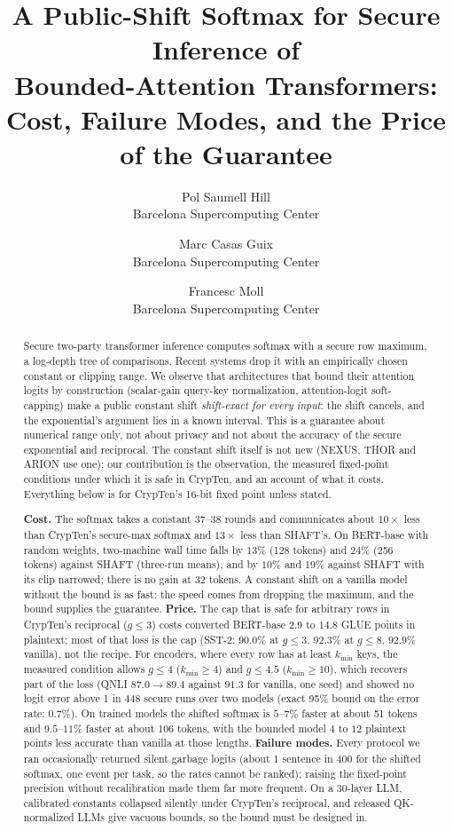 \documentclass[11pt]{article}
\title{A Public-Shift Softmax for Secure Inference of\\
Bounded-Attention Transformers: Cost, Failure Modes, and the Price of the Guarantee}
\author{Pol Saumell Hill\\\small Barcelona Supercomputing Center
\and Marc Casas Guix\\\small Barcelona Supercomputing Center
\and Francesc Moll\\\small Barcelona Supercomputing Center}
\date{}
\begin{document}
\maketitle

\begin{abstract}
Secure two-party transformer inference computes softmax with a secure row maximum, a log-depth tree of comparisons.
Recent systems drop it with an empirically chosen constant or clipping range. We observe that architectures that bound their
attention logits by construction (scalar-gain query-key normalization, attention-logit soft-capping) make a public constant
shift \emph{shift-exact for every input}: the shift cancels, and the exponential's argument lies in a known interval. This is a
guarantee about numerical range only, not about privacy and not about the accuracy of the secure exponential and reciprocal. The
constant shift itself is not new (NEXUS, THOR and ARION use one); our contribution is the observation, the measured fixed-point
conditions under which it is safe in CrypTen, and an account of what it costs. Everything below is for CrypTen's 16-bit fixed
point unless stated.

\textbf{Cost.} The softmax takes a constant 37--38 rounds and communicates about $10\times$ less than CrypTen's secure-max
softmax and $13\times$ less than SHAFT's. On BERT-base with random weights, two-machine wall time falls by $13\%$ (128 tokens) and
$24\%$ (256 tokens) against SHAFT (three-run means), and by $10\%$ and $19\%$ against SHAFT with its clip narrowed; there is no
gain at 32 tokens. A constant shift on a vanilla model without the bound is as fast: the speed comes from dropping the maximum, and the
bound supplies the guarantee. \textbf{Price.} The cap that is safe for arbitrary rows in CrypTen's reciprocal ($g\le3$) costs converted
BERT-base $2.9$ to $14.8$ GLUE points in plaintext; most of that loss is the cap (SST-2: $90.0\%$ at $g\le3$, $92.3\%$ at $g\le8$,
$92.9\%$ vanilla), not the recipe. For encoders, where every row has at least $k_{\min}$ keys, the measured condition allows
$g\le4$ ($k_{\min}\ge4$) and $g\le4.5$ ($k_{\min}\ge10$), which recovers part of the loss (QNLI $87.0\to89.4$ against $91.3$ for vanilla,
one seed) and showed no logit error above 1 in 448 secure runs over two models (exact 95\% bound on the error rate: $0.7\%$). On
trained models the shifted softmax is $5$--$7\%$ faster at about 51 tokens and $9.5$--$11\%$ faster at about 106 tokens, with the bounded
model $4$ to $12$ plaintext points less accurate than vanilla at those lengths. \textbf{Failure modes.} Every protocol we ran
occasionally returned silent garbage logits (about 1 sentence in 400 for the shifted softmax, one event per task, so the rates
cannot be ranked); raising the fixed-point precision without recalibration made them far more frequent. On a 30-layer LLM,
calibrated constants collapsed silently under CrypTen's reciprocal, and released QK-normalized LLMs give vacuous bounds, so the bound
must be designed in.
\end{abstract}
\end{document}
